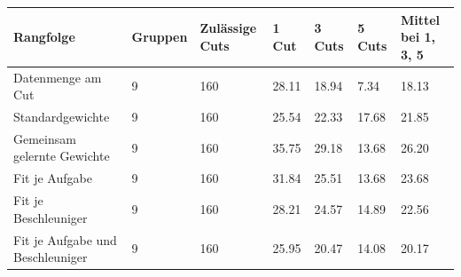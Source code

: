\begin{tabular}{@{}lllllll@{}}
\toprule
Rangfolge & Gruppen & Zulässige Cuts & 1 Cut & 3 Cuts & 5 Cuts & Mittel bei 1, 3, 5 \\
\midrule
Datenmenge am Cut & 9 & 160 & 28.11 & 18.94 & 7.34 & 18.13 \\
Standardgewichte & 9 & 160 & 25.54 & 22.33 & 17.68 & 21.85 \\
Gemeinsam gelernte Gewichte & 9 & 160 & 35.75 & 29.18 & 13.68 & 26.20 \\
Fit je Aufgabe & 9 & 160 & 31.84 & 25.51 & 13.68 & 23.68 \\
Fit je Beschleuniger & 9 & 160 & 28.21 & 24.57 & 14.89 & 22.56 \\
Fit je Aufgabe und Beschleuniger & 9 & 160 & 25.95 & 20.47 & 14.08 & 20.17 \\
\bottomrule
\end{tabular}
